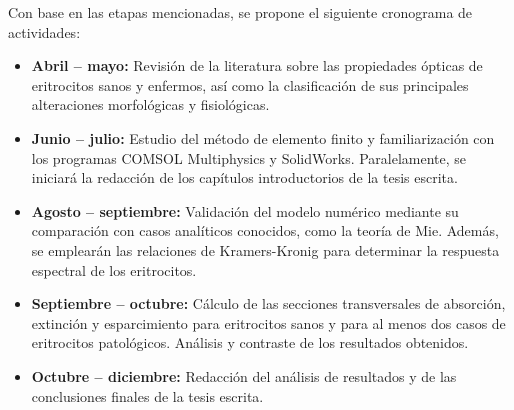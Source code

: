 \documentclass[11pt,letterpaper]{article}
\begin{document}
	Con base en las etapas mencionadas, se propone el siguiente cronograma de actividades:
	
	\begin{itemize} 
		\item \textbf{Abril – mayo:} Revisión de la literatura sobre las propiedades ópticas de eritrocitos sanos y enfermos, así como la clasificación de sus principales alteraciones morfológicas y fisiológicas.
		\item \textbf{Junio – julio:} Estudio del método de elemento finito y familiarización con los programas COMSOL Multiphysics y SolidWorks. Paralelamente, se iniciará la redacción de los capítulos introductorios de la tesis escrita.
		
		\item \textbf{Agosto – septiembre:} Validación del modelo numérico mediante su comparación con casos analíticos conocidos, como la teoría de Mie. Además, se emplearán las relaciones de Kramers-Kronig para determinar la respuesta espectral de los eritrocitos. 
		
		\item \textbf{Septiembre – octubre:} Cálculo de las secciones transversales de absorción, extinción y esparcimiento para eritrocitos sanos y para al menos dos casos de eritrocitos patológicos. Análisis y contraste de los resultados obtenidos.
		
		\item \textbf{Octubre – diciembre:} Redacción del análisis de resultados y de las conclusiones finales de la tesis escrita.
	\end{itemize}
	
\end{document}
